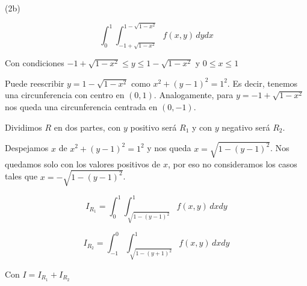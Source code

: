 \begin{exercise}

(2b) 

$$ \int_0^1 \int_{-1+\sqrt{1-x^2}}^{1-\sqrt{1-x^2}} \! f(x,y) \, dydx $$

Con condiciones $ -1+\sqrt{1-x^2} \leq y \leq 1-\sqrt{1-x^2} $ y $ 0 \leq x \leq 1 $

Puede reescribir $y = 1-\sqrt{1-x^2}$ como $x^2 + (y-1)^2 = 1^2$. Es decir, tenemos una circunferencia con centro en $(0,1)$. Analogamente, para $y = -1+\sqrt{1-x^2}$ nos queda una circunferencia centrada en $(0,-1)$.


Dividimos $R$ en dos partes, con $y$ positivo ser\'a $R_1$ y con $y$ negativo ser\'a $R_2$.

Despejamos $x$ de $x^2 + (y-1)^2 = 1^2$ y nos queda $x = \sqrt{1 - (y-1)^2}$. Nos quedamos solo con los valores positivos de $x$, por eso no consideramos los casos tales que $x = -\sqrt{1 - (y-1)^2}$.

$$ I_{R_1} = \int_0^1 \int_{\sqrt{1 - (y-1)^2}}^1 \! f(x,y) \, dx dy $$

$$ I_{R_2} = \int_{-1}^0 \int_{\sqrt{1 - (y+1)^2}}^1 \! f(x,y) \, dx dy $$

Con $I = I_{R_1} +I_{R_2} $

\end{exercise}